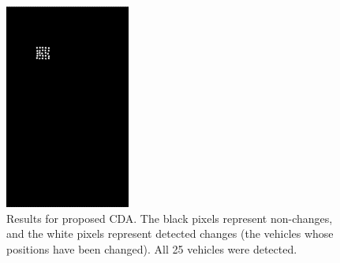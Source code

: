 \begin{figure}[H]
  \centering
  \includegraphics[width=0.8\linewidth]{Cap3-Results/results_carabas.png}
  \caption{Results for proposed CDA. The black pixels represent non-changes, and the white pixels represent detected changes (the vehicles whose positions have been changed). All 25 vehicles were detected.}
  \label{fig:carabas_results}
\end{figure}

